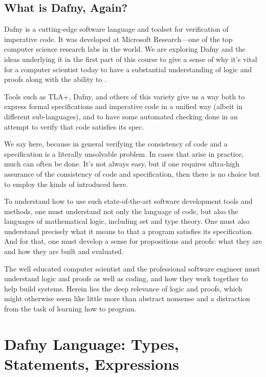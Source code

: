 \documentclass[letterpaper,10pt,english]{sphinxmanual}
\begin{document}
\section{What is Dafny, Again?}
\label{\detokenize{05-verifying-logical-specifications:what-is-dafny-again}}
Dafny is a cutting-edge software language and toolset for verification
of imperative code. It was developed at Microsoft Research—one of
the top computer science research labs in the world. We are exploring
Dafny and the ideas underlying it in the first part of this course to
give a sense of why it’s vital for a computer scientist today to have
a substantial understanding of logic and proofs along with the ability
to .

Tools such as TLA+, Dafny, and others of this variety give us a way
both to express formal specifications and imperative code in a unified
way (albeit in different sub-languages), and to have some automated
checking done in an attempt to verify that code satisfies its spec.

We say  here, because in general verifying the consistency of
code and a specification is a literally unsolvable problem. In cases
that arise in practice, much can often be done. It’s not always easy,
but if one requires ultra-high assurance of the consistency of code
and specification, then there is no choice but to employ the kinds of
 introduced here.

To understand how to use such state-of-the-art software development
tools and methods, one must understand not only the language of code,
but also the languages of mathematical logic, including set and type
theory. One must also understand precisely what it means to 
that a program satisfies its specification. And for that, one must
develop a sense for propositions and proofs: what they are and how
they are built and evaluated.

The well educated computer scientist and the professional software
engineer must understand logic and proofs as well as coding, and how
they work together to help build  systems. Herein lies
the deep relevance of logic and proofs, which might otherwise seem
like little more than abstract nonsense and a distraction from the
task of learning how to program.


\chapter{Dafny Language: Types, Statements, Expressions}
\label{\detokenize{06-dafny-language::doc}}\label{\detokenize{06-dafny-language:dafny-language-types-statements-expressions}}
\end{document}
